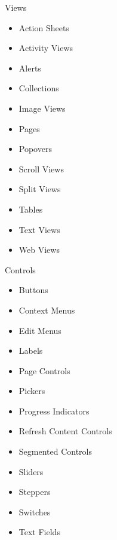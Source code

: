	Views
	\begin{itemize}
  		\vspace{-0.4cm}\item Action Sheets
		\vspace{-0.4cm}\item Activity Views
		\vspace{-0.4cm}\item Alerts
		\vspace{-0.4cm}\item Collections
		\vspace{-0.4cm}\item Image Views
		\vspace{-0.4cm}\item Pages
		\vspace{-0.4cm}\item Popovers
		\vspace{-0.4cm}\item Scroll Views
		\vspace{-0.4cm}\item Split Views
		\vspace{-0.4cm}\item Tables
		\vspace{-0.4cm}\item Text Views
		\vspace{-0.4cm}\item Web Views
	\end{itemize}
	
	Controls
	\begin{itemize}
  		\vspace{-0.4cm}\item Buttons
		\vspace{-0.4cm}\item Context Menus
		\vspace{-0.4cm}\item Edit Menus
		\vspace{-0.4cm}\item Labels
		\vspace{-0.4cm}\item Page Controls
		\vspace{-0.4cm}\item Pickers
		\vspace{-0.4cm}\item Progress Indicators
		\vspace{-0.4cm}\item Refresh Content Controls
		\vspace{-0.4cm}\item Segmented Controls
		\vspace{-0.4cm}\item Sliders
		\vspace{-0.4cm}\item Steppers
		\vspace{-0.4cm}\item Switches
		\vspace{-0.4cm}\item Text Fields
	\end{itemize}

